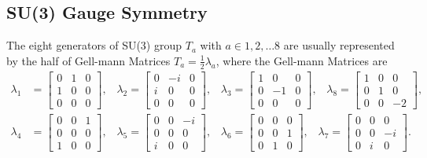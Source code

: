 \subsection{SU(3) Gauge Symmetry}
The eight generators of SU(3) group $T_a$ with $a \in {1,2,\dots 8}$ are usually represented by the half of Gell-mann Matrices $T_a = \frac{1}{2} \lambda_a$, where the Gell-mann Matrices are 
%
\begin{equation}
\begin{split}
    \lambda_1 &= \begin{bmatrix} 0 & 1 & 0 \\ 1 & 0 & 0 \\ 0 & 0 & 0\end{bmatrix}, \;\;\; 
    \lambda_2 = \begin{bmatrix} 0 &-i & 0 \\ i & 0 & 0 \\ 0 & 0 & 0\end{bmatrix}, \;\;\; 
    \lambda_3 = \begin{bmatrix} 1 & 0 & 0 \\ 0 &-1 & 0 \\ 0 & 0 & 0\end{bmatrix}, \;\;\; 
    \lambda_8 = \begin{bmatrix} 1 & 0 & 0 \\ 0 & 1 & 0 \\ 0 & 0 &-2\end{bmatrix}, \\
    \lambda_4 &= \begin{bmatrix} 0 & 0 & 1 \\ 0 & 0 & 0 \\ 1 & 0 & 0\end{bmatrix}, \;\;\; 
    \lambda_5 = \begin{bmatrix} 0 & 0 &-i \\ 0 & 0 & 0 \\ i & 0 & 0\end{bmatrix}, \;\;\; 
    \lambda_6 = \begin{bmatrix} 0 & 0 & 0 \\ 0 & 0 & 1 \\ 0 & 1 & 0\end{bmatrix}, \;\;\; 
    \lambda_7 = \begin{bmatrix} 0 & 0 & 0 \\ 0 & 0 &-i \\ 0 & i & 0\end{bmatrix}.
\end{split}
\end{equation}

